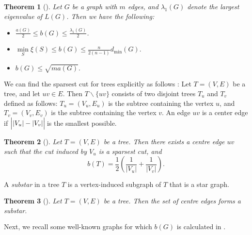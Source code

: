 \documentclass[12pt]{article}
\newtheorem{theorem}{Theorem}[section]
\begin{document}
\begin{theorem}[{\cite{enide-geir-2024}}]\label{b(g)-min-deg-cutsize}  Let $G$ be a graph with $m$ edges, and $\lambda_1(G)$ denote the largest eigenvalue of $L(G)$. Then we have the following: 
\begin{itemize}
\item[(a)] $\frac{a(G)}{2} \leq b(G) \leq \frac{\lambda_1(G)}{2}$.
\item[(b)] $\min\limits_S \xi(S) \leq b(G) \leq \frac{n}{2(n-1)}d_{\min}(G).$
\item[(c)] $b(G)\leq \sqrt{ma(G)}.$

\end{itemize}    
\end{theorem}
 
 
 We can find the sparsest cut for trees explicitly as follows \cite{enide-geir-2024}: Let $T=(V, E)$ be a tree, and let $u v \in E $. Then $T \backslash\{uv\}$ consists of two disjoint trees $T_u$ and $T_v$ defined as follows: $T_u=(V_u, E_u)$ is the subtree containing the vertex  $u$, and  $T_v=(V_v, E_v)$ is the subtree containing the vertex $v$. An edge $uv$ is a center edge if $ \Bigl|\vert V_u\vert-\vert V_v\vert \Bigl|\,$is the smallest possible.
 

 \begin{theorem}[{\cite[Theorem 5.1.]{enide-geir-2024}}]\label{tree case}
     Let $T=(V, E)$ be a tree. Then there exists a centre edge $uv$ such that the cut induced by $V_u$ is a sparsest cut, and 
\begin{equation*}
b(T)=\frac{1}{2}\left(\frac{1}{\vert V_u \vert} +\frac{1}{\vert V_v\vert} \right).
\end{equation*} 
 \end{theorem}



A \textit{substar} in a tree $T$ is a vertex-induced subgraph of $T$ that is a star graph.

\begin{theorem}[{\cite[Corollary 5.2]{enide-geir-2024}}]\label{substar}
Let $T=(V, E)$ be a tree. Then the set of centre edges forms a substar.    
\end{theorem}
Next, we recall some well-known graphs for which $b(G)$ is calculated in \cite{enide-geir-2024}. 
\end{document}
